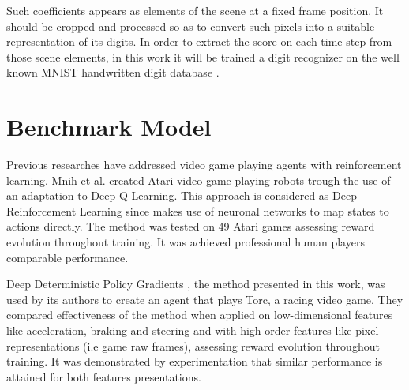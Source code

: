 \documentclass[peerreview]{IEEEtran}
\begin{document}
	  Such coefficients appears as elements of the scene at a fixed frame position. It should be cropped and processed so as to convert such pixels into a suitable representation of its digits. In order to extract the score on each time step from those scene elements, in this work it will be trained a digit recognizer on the well known MNIST handwritten digit database \cite{mnist}.	
	  
	  \section{Benchmark Model}
	  
	  Previous researches have addressed video game playing agents with reinforcement learning. Mnih et al.  \cite{replay_buffer_2015} created Atari video game playing robots trough the use of an adaptation to Deep Q-Learning. This approach is considered as Deep Reinforcement Learning since makes use of neuronal networks to map states to actions directly. The method was tested on 49 Atari games assessing reward evolution throughout training. It was achieved professional human players comparable performance. 
	  
	  Deep Deterministic Policy Gradients \cite{ddpg_2015}, the method presented in this work, was used by its authors to create an agent that plays Torc, a racing video game. They compared effectiveness of the method when applied on low-dimensional features like acceleration, braking and steering and with high-order features like pixel representations (i.e game raw frames), assessing reward evolution throughout training. It was demonstrated by experimentation that similar performance is attained for both features presentations.
 
\end{document}
